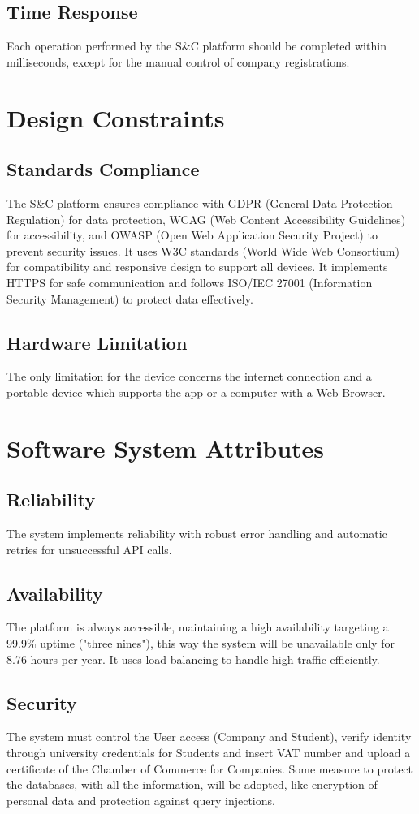\subsection{Time Response}
Each operation performed by the S\&C platform should be completed within milliseconds, except for the manual control of company registrations.
\section{Design Constraints}
\subsection{Standards Compliance}
The S\&C platform ensures compliance with GDPR (General Data Protection Regulation) for data protection, WCAG (Web Content Accessibility Guidelines) for accessibility, and OWASP (Open Web Application Security Project) to prevent security issues. It uses W3C standards (World Wide Web Consortium) for compatibility and responsive design to support all devices. It implements HTTPS for safe communication and follows ISO/IEC 27001 (Information Security Management) to protect data effectively.
\subsection{Hardware Limitation}
The only limitation for the device concerns the internet connection and a portable device which supports the app or a computer with a Web Browser.
\section{Software System Attributes}
\subsection{Reliability}
The system implements reliability with robust error handling and automatic retries for unsuccessful API calls. 
\subsection{Availability}
The platform is always accessible, maintaining a high availability targeting a 99.9\% uptime ("three nines"), this way the system will be unavailable only for 8.76 hours per year. It uses load balancing to handle high traffic efficiently.
\subsection{Security}
The system must control the User access (Company and Student), verify identity through university credentials for Students and insert VAT number and upload a certificate of the Chamber of Commerce for Companies. Some measure to protect the databases, with all the information, will be adopted, like encryption of personal data and protection against query injections.
